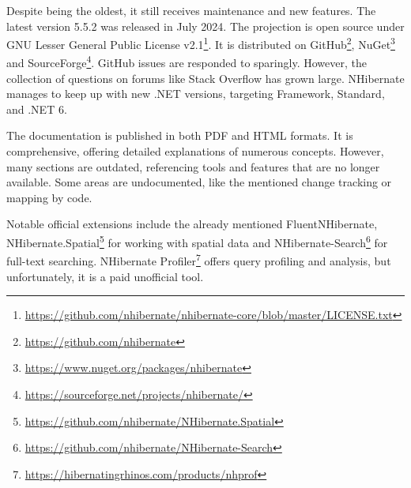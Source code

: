 Despite being the oldest, it still receives maintenance and new features. The latest version 5.5.2 was released in July 2024. The projection is open source under GNU Lesser General Public License v2.1\footnote{\url{https://github.com/nhibernate/nhibernate-core/blob/master/LICENSE.txt}}. It is distributed on GitHub\footnote{\url{https://github.com/nhibernate}}, NuGet\footnote{\url{https://www.nuget.org/packages/nhibernate}} and SourceForge\footnote{\url{https://sourceforge.net/projects/nhibernate/}}. GitHub issues are responded to sparingly. However, the collection of questions on forums like Stack Overflow has grown large. NHibernate manages to keep up with new .NET versions, targeting Framework, Standard, and .NET 6.

The documentation is published in both PDF and HTML formats. It is comprehensive, offering detailed explanations of numerous concepts. However, many sections are outdated, referencing tools and features that are no longer available. Some areas are undocumented, like the mentioned change tracking or mapping by code.

Notable official extensions include the already mentioned FluentNHibernate, {NHibernate.Spatial}\footnote{\url{https://github.com/nhibernate/NHibernate.Spatial}} for working with spatial data and NHibernate-Search\footnote{\url{https://github.com/nhibernate/NHibernate-Search}} for full-text searching. NHibernate Profiler\footnote{\url{https://hibernatingrhinos.com/products/nhprof}} offers query profiling and analysis, but unfortunately, it is a paid unofficial tool. 

